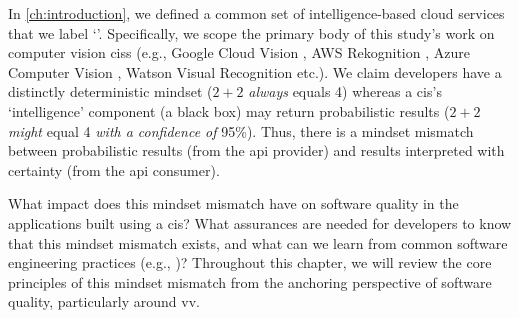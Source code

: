 \label{sec:lit-review:preface}

In \cref{ch:introduction}, we defined a common set of intelligence-based cloud services that we label `'. Specifically, we scope the primary body of this study's work on computer vision \glspl{cis} (e.g., Google Cloud Vision \citep{GoogleCloud:Home}, AWS Rekognition \citep{AWS:Home}, Azure Computer Vision \citep{Azure:Home}, Watson Visual Recognition \citep{IBM:Home} etc.). We claim developers have a distinctly deterministic mindset ($2+2$ \textit{always}  equals 4) whereas a \gls{cis}'s `intelligence' component (a black box) may return probabilistic results ($2+2$ \textit{might} equal 4 \textit{with a confidence of} 95\%). Thus, there is a mindset mismatch between probabilistic results (from the \gls{api} provider) and results interpreted with certainty (from the \gls{api} consumer).

What impact does this mindset mismatch have on software quality in the applications built using a \gls{cis}? What assurances are needed for developers to know that this mindset mismatch exists, and what can we learn from common software engineering practices (e.g., \citep{Pressman:2005vf,Sommerville:2011uc})? Throughout this chapter, we will review the core principles of this mindset mismatch from the anchoring perspective of software quality, particularly around \gls{vv}.